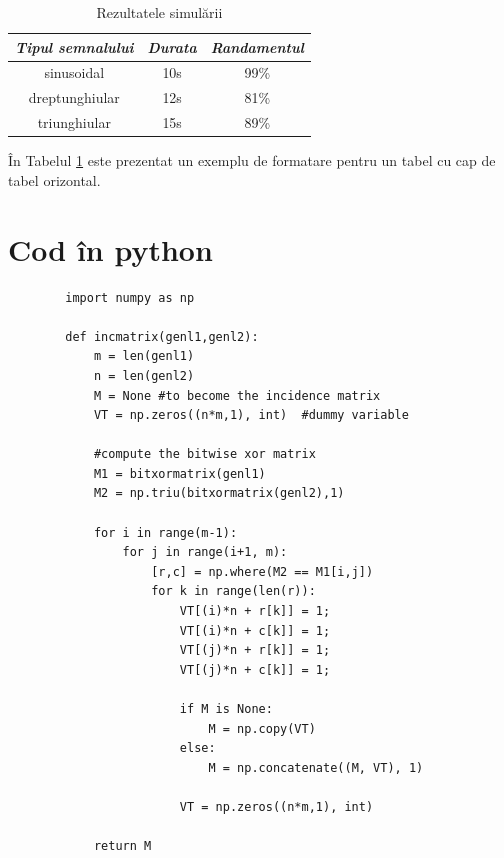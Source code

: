 \begin{table}[ht]
    \centering
    \caption{Rezultatele simulării}
    \begin{tabular}{|c|c|c|} 
        \hline
        \textbf{\textit{Tipul semnalului}} & \textbf{\textit{Durata}} & \textbf{\textit{Randamentul}} \\
        \hline
        sinusoidal & 10s & 99\% \\ 
        \hline
        dreptunghiular & 12s & 81\% \\
        \hline
        triunghiular & 15s & 89\% \\
        \hline
    \end{tabular}
    \label{tabel:2}
\end{table}

În Tabelul \ref{tabel:2} este prezentat un exemplu de formatare pentru un tabel cu cap de tabel orizontal.

\newpage
\section{Cod în python}
\label{anexa6:listing_python}

\begin{code}
    \begin{verbatim}
        import numpy as np
            
        def incmatrix(genl1,genl2):
            m = len(genl1)
            n = len(genl2)
            M = None #to become the incidence matrix
            VT = np.zeros((n*m,1), int)  #dummy variable
            
            #compute the bitwise xor matrix
            M1 = bitxormatrix(genl1)
            M2 = np.triu(bitxormatrix(genl2),1)
        
            for i in range(m-1):
                for j in range(i+1, m):
                    [r,c] = np.where(M2 == M1[i,j])
                    for k in range(len(r)):
                        VT[(i)*n + r[k]] = 1;
                        VT[(i)*n + c[k]] = 1;
                        VT[(j)*n + r[k]] = 1;
                        VT[(j)*n + c[k]] = 1;
                        
                        if M is None:
                            M = np.copy(VT)
                        else:
                            M = np.concatenate((M, VT), 1)
                        
                        VT = np.zeros((n*m,1), int)
            
            return M
    \end{verbatim} 
    \caption{Codul funcției \textit{incmatrix}} 
    \label{code:python_incmatrix}
\end{code}

